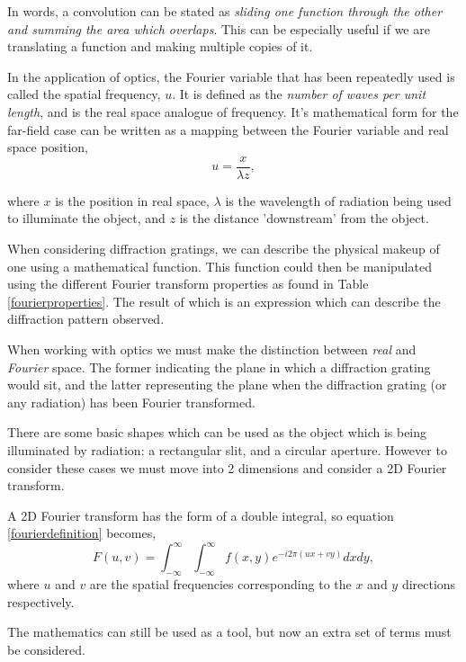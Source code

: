 \documentclass[twocolumn]{revtex4}
\begin{document}
In words, a convolution can be stated as \textit{sliding one function through the other and summing the area which overlaps}. This can be especially useful if we are translating a function and making multiple copies of it.

In the application of optics, the Fourier variable that has been repeatedly used is called the spatial frequency, $u$. It is defined as the \textsl{number of waves per unit length}, and is the real space analogue of frequency. It's mathematical form for the far-field case can be written as a mapping between the Fourier variable and real space position,
\begin{equation}
u=\frac{x}{\lambda z},
\end{equation}

where $x$ is the position in real space, $\lambda$ is the wavelength of radiation being used to illuminate the object, and $z$ is the distance 'downstream' from the object.

When considering diffraction gratings, we can describe the physical makeup of one using a mathematical function. This function could then be manipulated using the different Fourier transform properties as found in Table \ref{fourierproperties}. The result of which is an expression which can describe the diffraction pattern observed. 

When working with optics we must make the distinction between \textit{real} and \textit{Fourier} space. The former indicating the plane in which a diffraction grating would sit, and the latter representing the plane when the diffraction grating (or any radiation) has been Fourier transformed. 

There are some basic shapes which can be used as the object which is being illuminated by radiation: a rectangular slit, and a circular aperture. However to consider these cases we must move into 2 dimensions and consider a 2D Fourier transform. 

A 2D Fourier transform has the form of a double integral, so equation \ref{fourierdefinition} becomes,
\begin{equation}
F(u,v) = \int_{-\infty}^{\infty} \int_{-\infty}^{\infty}f(x,y)e^{-i2\pi(ux+vy)}dxdy,
\end{equation}
where $u$ and $v$ are the spatial frequencies corresponding to the $x$ and $y$ directions respectively.

The mathematics can still be used as a tool, but now an extra set of terms must be considered.
\end{document}
